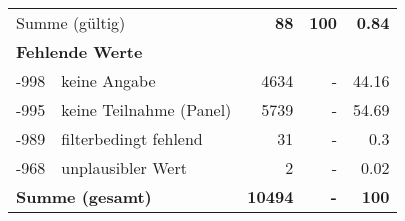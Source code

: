 \begin{longtable}{lXrrr}
     \midrule
     \multicolumn{2}{l}{Summe (gültig)} &
       \textbf{\num{88}} &
     \textbf{100} &
       \textbf{\num[round-mode=places,round-precision=2]{0,84}} \\
     \multicolumn{5}{l}{\textbf{Fehlende Werte}}\\
       -998 &
       keine Angabe &
         \num{4634} &
        - &
         \num[round-mode=places,round-precision=2]{44,16} \\
       -995 &
       keine Teilnahme (Panel) &
         \num{5739} &
        - &
         \num[round-mode=places,round-precision=2]{54,69} \\
       -989 &
       filterbedingt fehlend &
         \num{31} &
        - &
         \num[round-mode=places,round-precision=2]{0,3} \\
       -968 &
       unplausibler Wert &
         \num{2} &
        - &
         \num[round-mode=places,round-precision=2]{0,02} \\
     \midrule
     \multicolumn{2}{l}{\textbf{Summe (gesamt)}} &
          \textbf{\num{10494}} &
        \textbf{-} &
        \textbf{100} \\
     \bottomrule
     \end{longtable}
     
